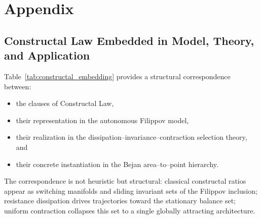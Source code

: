 \documentclass[12pt]{article}
\theoremstyle{plain}
\theoremstyle{definition}
\theoremstyle{remark}
\begin{document}
\appendix
\section{Appendix}
\label{sec:appendix}

\subsection{Constructal Law Embedded in Model, Theory, and Application}
\label{subsec:constructal_embedding_table}

Table~\ref{tab:constructal_embedding}
provides a structural correspondence between:

\begin{itemize}
\item[(i)] the clauses of Constructal Law,
\item[(ii)] their representation in the autonomous Filippov model,
\item[(iii)] their realization in the dissipation--invariance--contraction
selection theory, and
\item[(iv)] their concrete instantiation in the Bejan area--to--point hierarchy.
\end{itemize}

The correspondence is not heuristic but structural:
classical constructal ratios appear as switching manifolds
and sliding invariant sets of the Filippov inclusion;
resistance dissipation drives trajectories toward the
stationary balance set;
uniform contraction collapses this set to a single
globally attracting architecture.
\end{document}
